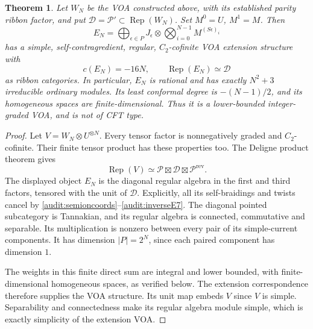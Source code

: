 \documentclass[11pt,a4paper]{article}
\numberwithin{equation}{section}
\newtheorem{theorem}{Theorem}[section]
\theoremstyle{definition}\newtheorem{definition}[theorem]{Definition}
\theoremstyle{remark}\newtheorem{remark}[theorem]{Remark}
\begin{document}
\begin{theorem}\label{audit:cancelVOA}
Let $W_N$ be the VOA constructed above, with its established parity
ribbon factor, and put
$\mathcal D=\mathcal P'\subset\operatorname{Rep}(W_N)$.
Set $M^0=U$, $M^1=M$. Then
\[
 E_N=\bigoplus_{\epsilon\in P}
       J_\epsilon\otimes\bigotimes_{i=0}^{N-1}M^{(S\epsilon)_i}
\]
has a simple, self-contragredient, regular, $C_2$-cofinite VOA
extension structure with
\[
 c(E_N)=-16N,\qquad
 \operatorname{Rep}(E_N)\simeq\mathcal D
\]
as ribbon categories. In particular, $E_N$ is rational and has
exactly $N^2+3$ irreducible ordinary modules. Its least conformal
degree is $-(N-1)/2$, and its homogeneous spaces are finite-dimensional.
Thus it is a lower-bounded integer-graded VOA, and is not of CFT type.
\end{theorem}
\begin{proof}
Let $V=W_N\otimes U^{\otimes N}$.
Every tensor factor is nonnegatively graded and $C_2$-cofinite.
Their finite tensor product has these properties too. The Deligne
product theorem \cite[Theorem 5.1]{c:McRaeDeligne} gives
\[
 \operatorname{Rep}(V)
 \simeq\mathcal P\boxtimes\mathcal D\boxtimes\mathcal P^{\mathrm{rev}}.
\]
The displayed object $E_N$ is the diagonal regular algebra in the
first and third factors, tensored with the unit of $\mathcal D$.
Explicitly, all its self-braidings and twists cancel by
\eqref{audit:semioncoords}--\eqref{audit:inverseE7}.
The diagonal pointed subcategory is Tannakian, and its regular
algebra is connected, commutative and separable.
Its multiplication is nonzero between every pair of its simple-current
components. It has dimension $|P|=2^N$, since each paired component
has dimension $1$.

The weights in this finite direct sum are integral and lower bounded,
with finite-dimensional homogeneous spaces, as verified below.
The extension correspondence
\cite[Theorem 7.5]{cmy} therefore supplies the VOA structure.
Its unit map embeds $V$ since $V$ is simple. Separability and
connectedness make its regular algebra module simple, which is
exactly simplicity of the extension VOA.


\end{proof}
\end{document}
